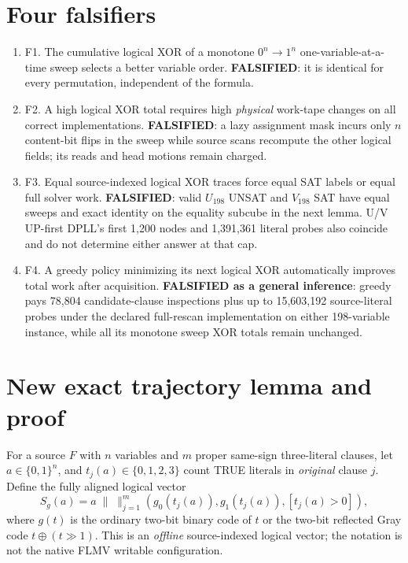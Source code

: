 \documentclass[11pt]{article}
\begin{document}
\section{Four falsifiers}
\begin{enumerate}
\item[] F1. The cumulative logical XOR of a monotone $0^n\to1^n$ one-variable-at-a-time sweep selects a better variable order. \textbf{FALSIFIED}: it is identical for every permutation, independent of the formula.
\item[] F2. A high logical XOR total requires high \emph{physical} work-tape changes on all correct implementations. \textbf{FALSIFIED}: a lazy assignment mask incurs only $n$ content-bit flips in the sweep while source scans recompute the other logical fields; its reads and head motions remain charged.
\item[] F3. Equal source-indexed logical XOR traces force equal SAT labels or equal full solver work. \textbf{FALSIFIED}: valid $U_{198}$ UNSAT and $V_{198}$ SAT have equal sweeps and exact identity on the equality subcube in the next lemma. U/V UP-first DPLL's first 1,200 nodes and 1,391,361 literal probes also coincide and do not determine either answer at that cap.
\item[] F4. A greedy policy minimizing its next logical XOR automatically improves total work after acquisition. \textbf{FALSIFIED as a general inference}: greedy pays 78,804 candidate-clause inspections plus up to 15,603,192 source-literal probes under the declared full-rescan implementation on either 198-variable instance, while all its monotone sweep XOR totals remain unchanged.
\end{enumerate}

\section{New exact trajectory lemma and proof}
For a source $F$ with $n$ variables and $m$ proper same-sign three-literal clauses, let $a\in\{0,1\}^n$, and $t_j(a)\in\{0,1,2,3\}$ count TRUE literals in \emph{original} clause $j$. Define the fully aligned logical vector
\[
 S_g(a)=a\;\|\;\big\|_{j=1}^m\left(g_0(t_j(a)),g_1(t_j(a)),[t_j(a)>0]\right),
\]
where $g(t)$ is the ordinary two-bit binary code of $t$ or the two-bit reflected Gray code $t\oplus(t\gg1)$. This is an \emph{offline} source-indexed logical vector; the notation is not the native FLMV writable configuration.
\end{document}
